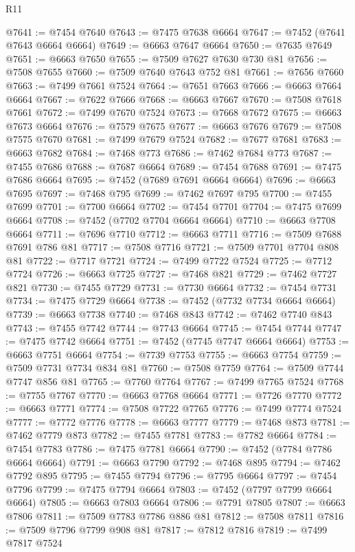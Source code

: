 \begin{lexlean}{R11}
\begin{coremodule}
@7641 := @7454 @7640
@7643 := @7475 @7638 @6664
@7647 := @7452 (@7641 @7643 @6664 @6664)
@7649 := @6663 @7647 @6664
@7650 := @7635 @7649
@7651 := @6663 @7650
@7655 := @7509 @7627 @7630 @730 @81
@7656 := @7508 @7655
@7660 := @7509 @7640 @7643 @752 @81
@7661 := @7656 @7660
@7663 := @7499 @7661 @7524
@7664 := @7651 @7663
@7666 := @6663 @7664 @6664
@7667 := @7622 @7666
@7668 := @6663 @7667
@7670 := @7508 @7618 @7661
@7672 := @7499 @7670 @7524
@7673 := @7668 @7672
@7675 := @6663 @7673 @6664
@7676 := @7579 @7675
@7677 := @6663 @7676
@7679 := @7508 @7575 @7670
@7681 := @7499 @7679 @7524
@7682 := @7677 @7681
@7683 := @6663 @7682
@7684 := @7468 @773
@7686 := @7462 @7684 @773
@7687 := @7455 @7686
@7688 := @7687 @6664
@7689 := @7454 @7688
@7691 := @7475 @7686 @6664
@7695 := @7452 (@7689 @7691 @6664 @6664)
@7696 := @6663 @7695
@7697 := @7468 @795
@7699 := @7462 @7697 @795
@7700 := @7455 @7699
@7701 := @7700 @6664
@7702 := @7454 @7701
@7704 := @7475 @7699 @6664
@7708 := @7452 (@7702 @7704 @6664 @6664)
@7710 := @6663 @7708 @6664
@7711 := @7696 @7710
@7712 := @6663 @7711
@7716 := @7509 @7688 @7691 @786 @81
@7717 := @7508 @7716
@7721 := @7509 @7701 @7704 @808 @81
@7722 := @7717 @7721
@7724 := @7499 @7722 @7524
@7725 := @7712 @7724
@7726 := @6663 @7725
@7727 := @7468 @821
@7729 := @7462 @7727 @821
@7730 := @7455 @7729
@7731 := @7730 @6664
@7732 := @7454 @7731
@7734 := @7475 @7729 @6664
@7738 := @7452 (@7732 @7734 @6664 @6664)
@7739 := @6663 @7738
@7740 := @7468 @843
@7742 := @7462 @7740 @843
@7743 := @7455 @7742
@7744 := @7743 @6664
@7745 := @7454 @7744
@7747 := @7475 @7742 @6664
@7751 := @7452 (@7745 @7747 @6664 @6664)
@7753 := @6663 @7751 @6664
@7754 := @7739 @7753
@7755 := @6663 @7754
@7759 := @7509 @7731 @7734 @834 @81
@7760 := @7508 @7759
@7764 := @7509 @7744 @7747 @856 @81
@7765 := @7760 @7764
@7767 := @7499 @7765 @7524
@7768 := @7755 @7767
@7770 := @6663 @7768 @6664
@7771 := @7726 @7770
@7772 := @6663 @7771
@7774 := @7508 @7722 @7765
@7776 := @7499 @7774 @7524
@7777 := @7772 @7776
@7778 := @6663 @7777
@7779 := @7468 @873
@7781 := @7462 @7779 @873
@7782 := @7455 @7781
@7783 := @7782 @6664
@7784 := @7454 @7783
@7786 := @7475 @7781 @6664
@7790 := @7452 (@7784 @7786 @6664 @6664)
@7791 := @6663 @7790
@7792 := @7468 @895
@7794 := @7462 @7792 @895
@7795 := @7455 @7794
@7796 := @7795 @6664
@7797 := @7454 @7796
@7799 := @7475 @7794 @6664
@7803 := @7452 (@7797 @7799 @6664 @6664)
@7805 := @6663 @7803 @6664
@7806 := @7791 @7805
@7807 := @6663 @7806
@7811 := @7509 @7783 @7786 @886 @81
@7812 := @7508 @7811
@7816 := @7509 @7796 @7799 @908 @81
@7817 := @7812 @7816
@7819 := @7499 @7817 @7524

\end{coremodule}
\end{lexlean}
